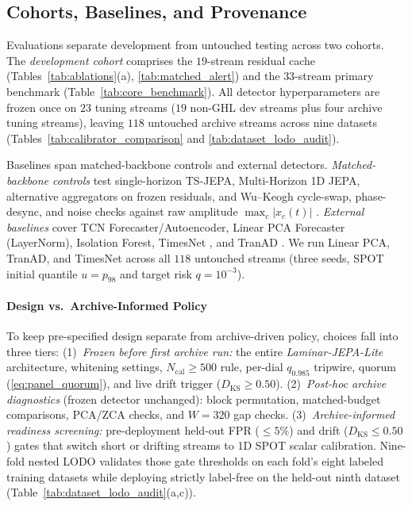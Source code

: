 \subsection{Cohorts, Baselines, and Provenance}
\label{subsec:cohort_repro}
Evaluations separate development from untouched testing across two cohorts. The \emph{development cohort} comprises the $19$-stream residual cache (Tables~\ref{tab:ablations}(a), \ref{tab:matched_alert}) and the $33$-stream primary benchmark (Table~\ref{tab:core_benchmark}). All detector hyperparameters are frozen once on $23$ tuning streams ($19$ non-GHL dev streams plus four archive tuning streams), leaving $118$ untouched archive streams across nine datasets (Tables~\ref{tab:calibrator_comparison} and \ref{tab:dataset_lodo_audit}).

Baselines span matched-backbone controls and external detectors. \emph{Matched-backbone controls} test single-horizon TS-JEPA, Multi-Horizon 1D JEPA, alternative aggregators on frozen residuals, and Wu--Keogh cycle-swap, phase-desync, and noise checks against raw amplitude $\max_c|x_c(t)|$ \cite{wu2023flawed}. \emph{External baselines} cover TCN Forecaster/Autoencoder, Linear PCA Forecaster (LayerNorm), Isolation Forest, TimesNet \cite{wu2023timesnet}, and TranAD \cite{tuli2022tranad}. We run Linear PCA, TranAD, and TimesNet across all $118$ untouched streams (three seeds, SPOT initial quantile $u=p_{98}$ and target risk $q=10^{-3}$).

\paragraph{Design vs.\ Archive-Informed Policy}
To keep pre-specified design separate from archive-driven policy, choices fall into three tiers:
(1)~\emph{Frozen before first archive run:} the entire \emph{Laminar-JEPA-Lite} architecture, whitening settings, $N_{\text{cal}} \ge 500$ rule, per-dial $q_{0.985}$ tripwire, quorum (\ref{eq:panel_quorum}), and live drift trigger ($D_{\text{KS}} \ge 0.50$).
(2)~\emph{Post-hoc archive diagnostics} (frozen detector unchanged): block permutation, matched-budget comparisons, PCA/ZCA checks, and $W=320$ gap checks.
(3)~\emph{Archive-informed readiness screening:} pre-deployment held-out FPR ($\le 5\%$) and drift ($D_{\text{KS}} \le 0.50$) gates that switch short or drifting streams to 1D SPOT scalar calibration. Nine-fold nested LODO validates those gate thresholds on each fold's eight labeled training datasets while deploying strictly label-free on the held-out ninth dataset (Table~\ref{tab:dataset_lodo_audit}(a,c)).

